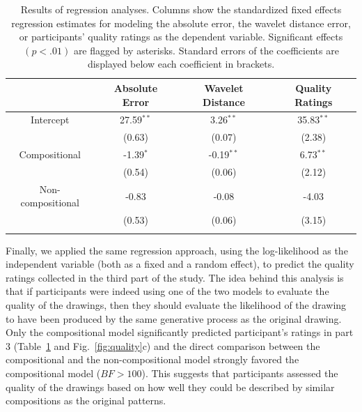 \documentclass[a4paper,man, floatsintext, natbib]{apa6}
\begin{document}
\begin{table}[ht!]
  \begin{center}
    \caption{Results of regression analyses. Columns show the standardized fixed effects regression estimates for modeling the absolute error, the wavelet distance error, or participants' quality ratings as the dependent variable. Significant effects $(p<.01)$ are flagged by asterisks. Standard errors of the coefficients are displayed below each coefficient in brackets.}
    \label{tab:results}
    \begin{tabular}{cccc}
    \toprule
      & \textbf{Absolute Error} & \textbf{Wavelet Distance} & \textbf{Quality Ratings}\\
    \midrule
      Intercept         & 27.59$^{**}$ & 3.26$^{**}$ & 35.83$^{**}$\\
                        & (0.63)    & (0.07) & (2.38)\\
      Compositional     & -1.39$^{*}$ & -0.19$^{**}$ &6.73$^{**}$\\
                        & (0.54)    & (0.06) &(2.12)  \\
      Non-compositional & -0.83    & -0.08 & -4.03\\
                        & (0.53)    & (0.06) & (3.15)\\
\bottomrule
\addlinespace[1ex]
\multicolumn{3}{l}{\textsuperscript{**}$p<.001$, \textsuperscript{*}$p<.01$}
\end{tabular}
\end{center}
\end{table}

Finally, we applied the same regression approach, using the log-likelihood as the independent variable (both as a fixed and a random effect), to predict the quality ratings collected in the third part of the study. The idea behind this analysis is that if participants were indeed using one of the two models to evaluate the quality of the drawings, then they should evaluate the likelihood of the drawing to have been produced by the same generative process as the original drawing. Only the compositional model significantly predicted participant's ratings in part 3 (Table~\ref{tab:results} and Fig.~\ref{fig:quality}c) and the direct comparison between the compositional and the non-compositional model strongly favored the compositional model ($BF>100$). This suggests that participants assessed the quality of the drawings based on how well they could be described by similar compositions as the original patterns.
\end{document}

